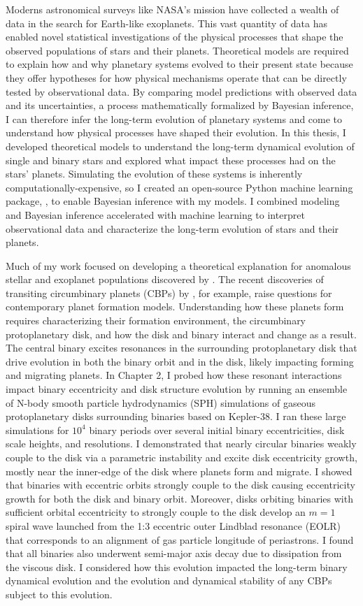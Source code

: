 Moderns astronomical surveys like NASA's \kepler mission have collected a wealth of data in the search for Earth-like exoplanets. This vast quantity of data has enabled novel statistical investigations of the physical processes that shape the observed populations of stars and their planets. Theoretical models are required to explain how and why planetary systems evolved to their present state because they offer hypotheses for how physical mechanisms operate that can be directly tested by observational data. By comparing model predictions with observed data and its uncertainties, a process mathematically formalized by Bayesian inference, I can therefore infer the long-term evolution of planetary systems and come to understand how physical processes have shaped their evolution. In this thesis, I developed theoretical models to understand the long-term dynamical evolution of single and binary stars and explored what impact these processes had on the stars' planets. Simulating the evolution of these systems is inherently computationally-expensive, so I created an open-source Python machine learning package, \approxposterior, to enable Bayesian inference with my models. I combined modeling and Bayesian inference accelerated with machine learning to interpret observational data and characterize the long-term evolution of stars and their planets.

Much of my work focused on developing a theoretical explanation for anomalous stellar and exoplanet populations discovered by \kepler. The recent discoveries of transiting circumbinary planets (CBPs) by \kepler, for example, raise questions for contemporary planet formation models.  Understanding how these planets form requires characterizing their formation environment, the circumbinary protoplanetary disk, and how the disk and binary interact and change as a result.  The central binary excites resonances in the surrounding protoplanetary disk that drive evolution in both the binary orbit and in the disk, likely impacting forming and migrating planets.  In Chapter 2, I probed how these resonant interactions impact binary eccentricity and disk structure evolution by running an ensemble of N-body smooth particle hydrodynamics (SPH) simulations of gaseous protoplanetary disks surrounding binaries based on Kepler-38. I ran these large simulations for $10^4$ binary periods over several initial binary eccentricities, disk scale heights, and resolutions.  I demonstrated that nearly circular binaries weakly couple to the disk via a parametric instability and excite disk eccentricity growth, mostly near the inner-edge of the disk where planets form and migrate.  I showed that binaries with eccentric orbits strongly couple to the disk causing eccentricity growth for both the disk and binary orbit. Moreover, disks orbiting binaries with sufficient orbital eccentricity to strongly couple to the disk develop an $m = 1$ spiral wave launched from the 1:3 eccentric outer Lindblad resonance (EOLR) that corresponds to an alignment of gas particle longitude of periastrons. I found that all binaries also underwent semi-major axis decay due to dissipation from the viscous disk. I considered how this evolution impacted the long-term binary dynamical evolution and the evolution and dynamical stability of any CBPs subject to this evolution. 


